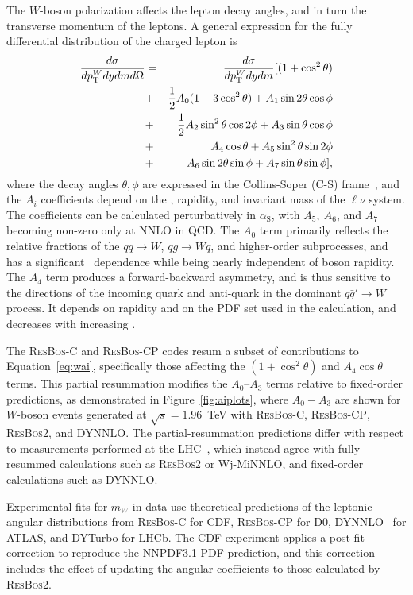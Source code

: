 
The $W$-boson polarization affects the lepton decay angles, and in turn the transverse momentum of the leptons.
A general expression for the fully differential distribution of the charged lepton is 
\begin{eqnarray}
\frac{d\sigma}{dp_{\scriptsize\textrm{T}}^{W} dy dm d\Omega}  & = & \frac{d\sigma}{dp_{\scriptsize\textrm{T}}^{W} dy dm} [(1 + \cos^2\theta) \nonumber \\
 & + &  \frac{1}{2} A_0 (1-3\cos^2\theta) + A_1 \sin 2\theta \cos\phi  \nonumber \\
 & + & \frac{1}{2}A_2 \sin^2\theta\cos 2\phi + A_3 \sin\theta\cos\phi \nonumber \\
 & + & A_4 \cos\theta + A_5 \sin^2\theta\sin 2\phi \nonumber \\
 & + & A_6 \sin 2\theta\sin\phi + A_7 \sin\theta\sin\phi ],
\label{eq:wai}
\end{eqnarray}
where the decay angles $\theta, \phi$ are expressed in the Collins-Soper (C-S) frame~\cite{Collins:1977iv},
and the $A_i$ coefficients depend on the \pT, rapidity, and invariant mass of the $\ell\nu$ system.  The 
coefficients can be calculated perturbatively in $\alpha_{\mathrm{S}}$, with $A_5,~A_6$, and $A_7$ becoming non-zero
only at NNLO in QCD.  The $A_0$ term primarily reflects the relative fractions of the $qq\to W$, $qg\to Wq$, and
higher-order subprocesses, and has a significant \pTW~dependence while being nearly independent of boson rapidity.
The $A_4$ term produces a forward-backward asymmetry, and is thus sensitive to the directions of the incoming
quark and anti-quark in the dominant $q\bar{q}' \to W$ process. It depends on rapidity and on the PDF set used
in the calculation, and decreases with increasing \pTW. 

The \textsc{ResBos-C} and \textsc{ResBos-CP} codes resum a subset of contributions to Equation~\ref{eq:wai},
specifically those affecting the $(1 + \cos^2\theta)$ and $A_4 \cos\theta$ terms.  This partial resummation modifies
the $A_0$--$A_3$ terms relative to fixed-order predictions, as demonstrated in Figure~\ref{fig:aiplots}, where
$A_0-A_3$ are shown for $W$-boson events generated at $\sqrt{s}=1.96$~TeV with \textsc{ResBos-C}, \textsc{ResBos-CP},
\textsc{ResBos2}, and \textsc{DYNNLO}.  The partial-resummation predictions differ with respect to measurements
performed at the LHC~\cite{STDM-2014-10}, which instead agree with fully-resummed calculations such as
\textsc{ResBos2} or {\sc Wj-MiNNLO}, and fixed-order calculations such as \textsc{DYNNLO}.  

Experimental fits for $m_W$ in data use theoretical predictions of the leptonic angular distributions from
\textsc{ResBos-C} for CDF, \textsc{ResBos-CP} for D0, \textsc{DYNNLO}~\cite{Catani:2007vq,Catani:2009sm} for
ATLAS, and DYTurbo for LHCb.  The CDF experiment applies a post-fit correction to reproduce the NNPDF3.1 PDF
prediction, and this correction includes the effect of updating the angular coefficients to those calculated
by \textsc{ResBos2}.  

